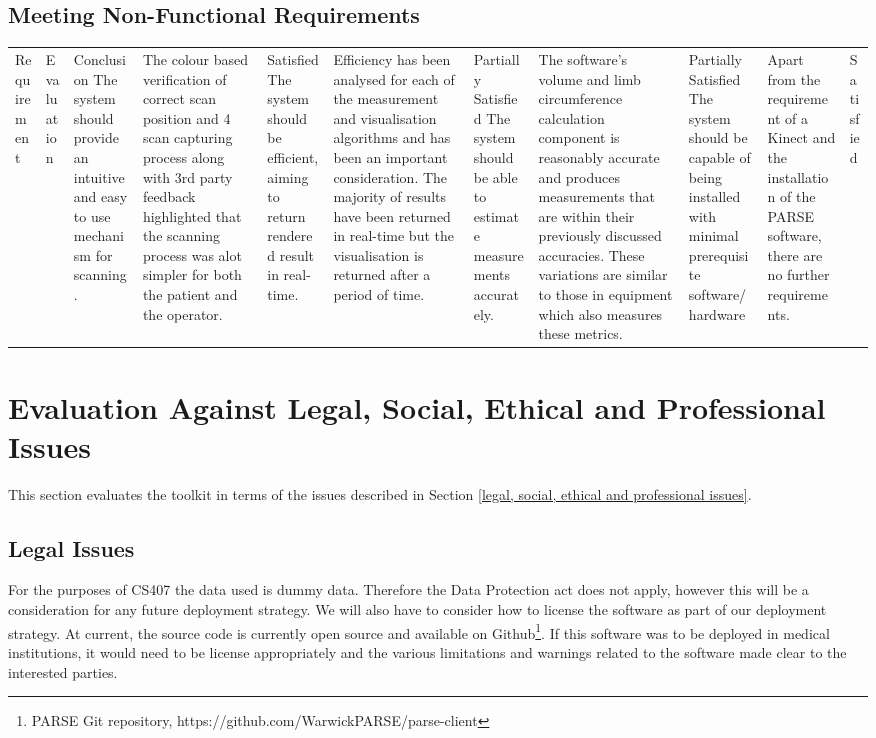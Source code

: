 \subsection{Meeting Non-Functional Requirements}

\begin{longtable}{|p{5cm}|p{5cm}|p{2.1cm}|}
    \hline
    Requirement & Evaluation & Conclusion \hline
    The system should provide an intuitive and easy to use mechanism for scanning. & The colour based verification of correct scan position and 4 scan capturing process along with 3rd party feedback highlighted that the scanning process was alot simpler for both the patient and the operator. & Satisfied \hline
    The system should be efficient, aiming to return rendered result in real-time. & Efficiency has been analysed for each of the measurement and visualisation algorithms and has been an important consideration. The majority of results have been returned in real-time but the visualisation is returned after a period of time. & Partially Satisfied \hline
    The system should be able to estimate measurements accurately. & The software's volume and limb circumference calculation component is reasonably accurate and produces measurements that are within their previously discussed accuracies. These variations are similar to those in equipment which also measures these metrics. & Partially Satisfied \hline
    The system should be capable of being installed with minimal prerequisite software/hardware & Apart from the requirement of a Kinect and the installation of the PARSE software, there are no further requirements. & Satisfied \hline

\end{longtable}

\section{Evaluation Against Legal, Social, Ethical and Professional Issues}
This section evaluates the toolkit in terms of the issues described in Section \ref{legal, social, ethical and professional issues}.

\subsection{Legal Issues}

For the purposes of CS407 \cite{ouroboros2007} the data used is dummy data. Therefore the Data Protection act does not apply, however this will be a consideration for any future deployment strategy. We will also have to consider how to license the software as part of our deployment strategy. At current, the source code is currently open source and available on Github\footnote{PARSE Git repository, https://github.com/WarwickPARSE/parse-client}. If this software was to be deployed in medical institutions, it would need to be license appropriately and the various limitations and warnings related to the software made clear to the interested parties.

